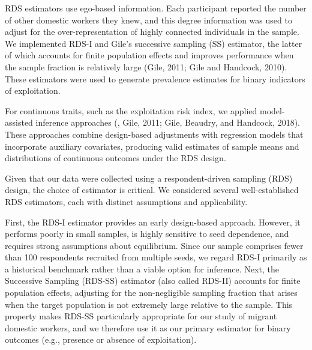 \documentclass[
  12pt,
  letterpaper,
  DIV=11,
  numbers=noendperiod]{scrartcl}
\theoremstyle{plain}
\theoremstyle{definition}
\begin{document}
RDS estimators use ego-based information. Each participant reported the
number of other domestic workers they knew, and this degree information
was used to adjust for the over-representation of highly connected
individuals in the sample. We implemented RDS-I and Gile's successive
sampling (SS) estimator, the latter of which accounts for finite
population effects and improves performance when the sample fraction is
relatively large (Gile, 2011; Gile and Handcock, 2010). These estimators
were used to generate prevalence estimates for binary indicators of
exploitation.

For continuous traits, such as the exploitation risk index, we applied
model-assisted inference approaches (\textcite{gile15-network}, Gile,
2011; Gile, Beaudry, and Handcock, 2018). These approaches combine
design-based adjustments with regression models that incorporate
auxiliary covariates, producing valid estimates of sample means and
distributions of continuous outcomes under the RDS design.

Given that our data were collected using a respondent-driven sampling
(RDS) design, the choice of estimator is critical. We considered several
well-established RDS estimators, each with distinct assumptions and
applicability.

First, the RDS-I estimator \textcite{salg04-sampling} provides an early
design-based approach. However, it performs poorly in small samples, is
highly sensitive to seed dependence, and requires strong assumptions
about equilibrium. Since our sample comprises fewer than 100 respondents
recruited from multiple seeds, we regard RDS-I primarily as a historical
benchmark rather than a viable option for inference.\autocite[\^{} The
Volz--Heckathorn (VH) estimator][ offers a probability-based refinement
of RDS-I. It is more robust but assumes a large population relative to
the sample size and does not adjust for finite-population effects.
Although our diagnostic checks indicated approximate equilibrium across
key demographics, the VH estimator is best used here as a robustness
check rather than the primary estimator.]{volz08-probability} Next, the
Successive Sampling (RDS-SS) estimator (also called RDS-II)
\textcite{gile11-improved} accounts for finite population effects,
adjusting for the non-negligible sampling fraction that arises when the
target population is not extremely large relative to the sample. This
property makes RDS-SS particularly appropriate for our study of migrant
domestic workers, and we therefore use it as our primary estimator for
binary outcomes (e.g., presence or absence of exploitation).
\end{document}
